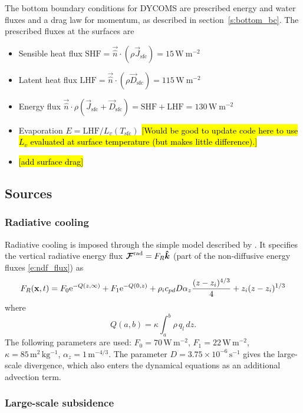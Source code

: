 \documentclass{report}
\begin{document}
The bottom boundary conditions for DYCOMS are prescribed energy and water fluxes and a drag law for momentum, as described in section~\ref{s:bottom_bc}. The prescribed fluxes at the surfaces are
\begin{itemize} 
\item Sensible heat flux $\mathrm{SHF} = \vec{\hat n} \cdot (\rho \vec{J}_{\mathrm{sfc}}) = 15\,\mathrm{W~m{^{-2}}}$
\item Latent heat flux $\mathrm{LHF} = \vec{\hat n} \cdot (\rho \vec{D}_{\mathrm{sfc}}) = 115\,\mathrm{W~m^{-2}}$
\item Energy flux $\vec{\hat n} \cdot \rho (\vec{J}_{\mathrm{sfc}} + \vec{D}_{\mathrm{sfc}}) = \mathrm{SHF + LHF} = 130\,\mathrm{W~m^{-2}}$
\item Evaporation $E = \mathrm{LHF}/L_{v}(T_\mathrm{sfc})$ \hl{[Would be good to update code here to use $L_v$ evaluated at surface temperature (but makes little difference).]}
\item \hl{[add surface drag]}
\end{itemize}

\subsection{Sources}

\subsubsection{Radiative cooling}
Radiative cooling is imposed through the simple model described by \cite{Stevens05a}. It specifies the vertical radiative energy flux $\boldsymbol{{\mathcal{F}}}^{\mathrm{rad}} = F_R \boldsymbol{{\hat k}}$ (part of the non-diffusive energy fluxes \eqref{e:ndf_flux}) as
\begin{equation}
    \label{e:radiativeStevens05}
    F_{R}({\bf x}, t) = F_0{\rm e}^{-Q(z,\infty)} +
    F_1{\rm e}^{-Q(0, z)} +
    \rho_i c_{pd} D \alpha_z\frac{(z-z_i)^{4/3}}{4} + z_i(z - z_i)^{1/3}
\end{equation}
where 
\begin{equation}
    Q(a,b) = \kappa\int_{a}^{b}\rho\,q_l\,dz.
\end{equation}
The following parameters are used:
$F_0=70\,\mathrm{W\,m^{-2}}$, $F_1=22\,\mathrm{W\,m^{-2}}$, $\kappa=85\,\mathrm{m^2\,kg^{-1}}$, $\alpha_z=1\,\mathrm{m^{-4/3}}$. The parameter $D=3.75\times 10^{-6}\,\mathrm{s^{-1}}$ gives the large-scale divergence, which also enters the dynamical equations as an additional advection term.  

\subsubsection{Large-scale subsidence}
\end{document}
